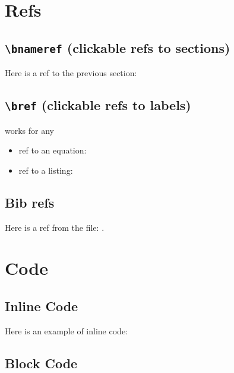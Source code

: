\section{Refs}

\subsection{\texttt{{\normalfont \textbackslash}bnameref} (clickable refs to sections)}
Here is a ref to the previous section:

\subsection{\texttt{{\normalfont \textbackslash}bref} (clickable refs to labels)}

{}
works for any

\begin{itemize}
    \item ref to an equation: 
    \item ref to a listing: 
\end{itemize}

\subsection{Bib refs}

Here is a ref from the  file: \textcite{Guilhoto2018}.


\section{Code}

\subsection{Inline Code}

Here is an example of inline code:

\subsection{Block Code}

